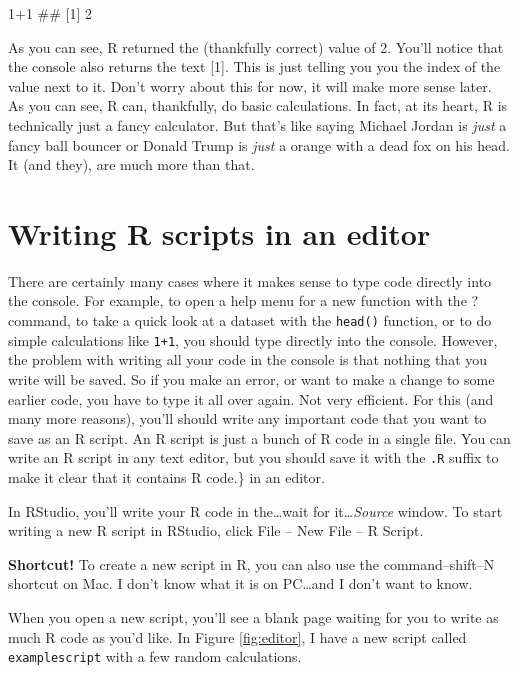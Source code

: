\documentclass[]{book}
\newenvironment{Shaded}{\begin{snugshade}}{\end{snugshade}}
\newcommand{\DecValTok}[1]{\textcolor[rgb]{0.00,0.00,0.81}{{#1}}}
\newcommand{\NormalTok}[1]{{#1}}
\theoremstyle{definition}
\theoremstyle{definition}
\theoremstyle{remark}
\begin{document}
\begin{Shaded}
\begin{Highlighting}[]
\DecValTok{1+1}
\NormalTok{## [1] 2}
\end{Highlighting}
\end{Shaded}

As you can see, R returned the (thankfully correct) value of 2. You'll
notice that the console also returns the text {[}1{]}. This is just
telling you you the index of the value next to it. Don't worry about
this for now, it will make more sense later. As you can see, R can,
thankfully, do basic calculations. In fact, at its heart, R is
technically just a fancy calculator. But that's like saying Michael
Jordan is \emph{just} a fancy ball bouncer or Donald Trump is
\emph{just} a orange with a dead fox on his head. It (and they), are
much more than that.

\section{Writing R scripts in an
editor}\label{writing-r-scripts-in-an-editor}

There are certainly many cases where it makes sense to type code
directly into the console. For example, to open a help menu for a new
function with the ? command, to take a quick look at a dataset with the
\texttt{head()} function, or to do simple calculations like
\texttt{1+1}, you should type directly into the console. However, the
problem with writing all your code in the console is that nothing that
you write will be saved. So if you make an error, or want to make a
change to some earlier code, you have to type it all over again. Not
very efficient. For this (and many more reasons), you'll should write
any important code that you want to save as an R script. An R script is
just a bunch of R code in a single file. You can write an R script in
any text editor, but you should save it with the \texttt{.R} suffix to
make it clear that it contains R code.\} in an editor.

In RStudio, you'll write your R code in the\ldots{}wait for
it\ldots{}\emph{Source} window. To start writing a new R script in
RStudio, click File -- New File -- R Script.

\textbf{Shortcut!} To create a new script in R, you can also use the
command--shift--N shortcut on Mac. I don't know what it is on
PC\ldots{}and I don't want to know.

When you open a new script, you'll see a blank page waiting for you to
write as much R code as you'd like. In Figure \ref{fig:editor}, I have a
new script called \texttt{examplescript} with a few random calculations.
\end{document}
